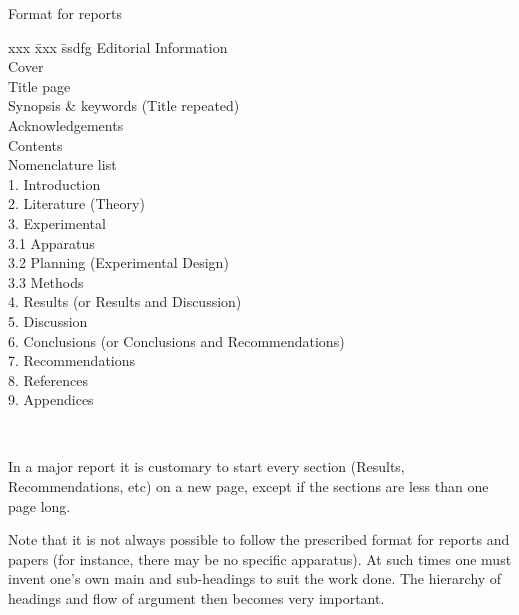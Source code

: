 \documentclass[a5paper, 10pt]{article}
\begin{document}
\begin{table}[htbp]
\begin{centering}
\caption[Format for reports]{Format for reports}
\label{tab:reportformat}

\begin{boxedminipage}[t]{0.8\textwidth}
  \begin{spacing}{1.8}
    \begin{tabbing}
      xxx \= xxx \= ssdfg \kill
      Editorial Information                                    \\
          \> Cover                                             \\
          \> Title page                                        \\
          \> Synopsis \& keywords (Title repeated)             \\
          \> Acknowledgements                                  \\
          \> Contents                                          \\
          \> Nomenclature list                                 \\
      1.  \> Introduction                                      \\
      2.  \> Literature (Theory)                               \\
      3.  \> Experimental                                      \\
      3.1 \> Apparatus                                         \\
      3.2 \> Planning (Experimental Design)                    \\
      3.3 \> Methods                                           \\
      4.  \> Results  (or Results and Discussion)              \\
      5.  \> Discussion                                        \\
      6.  \> Conclusions  (or Conclusions and Recommendations) \\
      7.  \> Recommendations                                   \\
      8.  \> References                                        \\
      9.  \> Appendices
    \end{tabbing}
  \end{spacing}
\end{boxedminipage}                                            \\
\end{centering}
In a major report it is customary to start every section (Results,
Recommendations, etc) on a new page, except if the sections are less than one page long.\bigskip

Note that it is not always possible to follow the prescribed format for reports and papers (for instance, there may be no specific apparatus).  
At such times one must invent one's own main and sub-headings to suit the work done.  
The hierarchy of headings and flow of argument then becomes very important.
\end{table}
\end{document}
